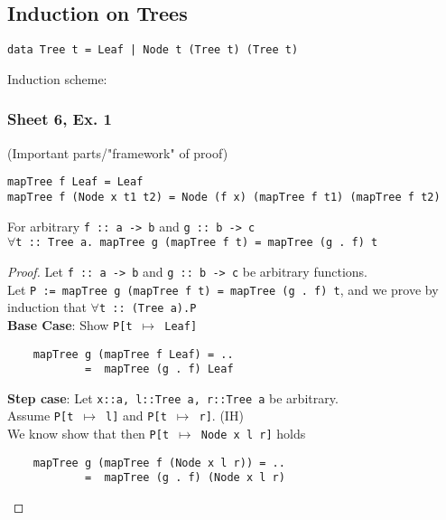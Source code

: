 \documentclass[12pt]{article}
\begin{document}
\subsection{Induction on Trees}
\begin{verbatim}
data Tree t = Leaf | Node t (Tree t) (Tree t)
\end{verbatim}

Induction scheme:
\begin{prooftree}
\end{prooftree}

\subsubsection{Sheet 6, Ex. 1}
(Important parts/"framework" of proof) 
\begin{verbatim}
mapTree f Leaf = Leaf
mapTree f (Node x t1 t2) = Node (f x) (mapTree f t1) (mapTree f t2) 
\end{verbatim}  
For arbitrary \texttt{f :: a -> b} and \texttt{g :: b -> c} \\
$\forall$\texttt{t :: Tree a. mapTree g (mapTree f t) = mapTree (g . f) t}

\begin{proof}
Let \texttt{f :: a -> b} and \texttt{g :: b -> c} be arbitrary functions. \\
Let \texttt{P := mapTree g (mapTree f t) = mapTree (g . f) t}, and we prove by induction that 
$\forall$\texttt{t :: (Tree a).P} \\
\textbf{Base Case}: Show \texttt{P[t $\mapsto$ Leaf]} 
\begin{verbatim}
    mapTree g (mapTree f Leaf) = ..
            =  mapTree (g . f) Leaf
\end{verbatim}
\textbf{Step case}: 
Let \texttt{x::a, l::Tree a, r::Tree a} be arbitrary. \\
Assume \texttt{P[t $\mapsto$ l]} and \texttt{P[t $\mapsto$ r]}. (IH) \\
We know show that then \texttt{P[t $\mapsto$ Node x l r]} holds 
\begin{verbatim}
    mapTree g (mapTree f (Node x l r)) = ..
            =  mapTree (g . f) (Node x l r)
\end{verbatim}
\end{proof}
\end{document}
